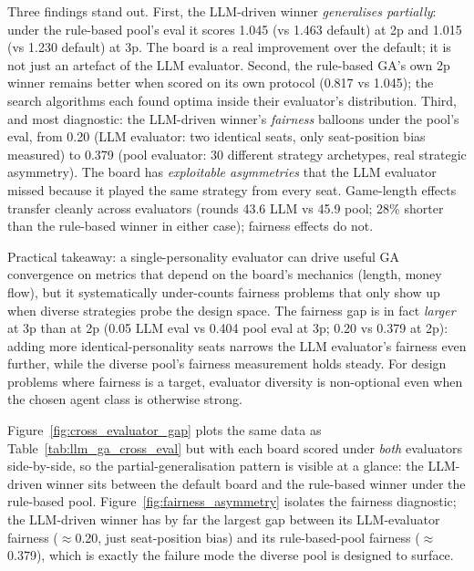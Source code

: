 \documentclass[10pt]{article}
\begin{document}
Three findings stand out. First, the LLM-driven winner \emph{generalises
partially}: under the rule-based pool's eval it scores 1.045 (vs
1.463 default) at 2p and 1.015 (vs 1.230 default) at 3p. The board is
a real improvement over the default; it is not just an artefact of the
LLM evaluator. Second, the rule-based GA's own 2p winner remains
better when scored on its own protocol (0.817 vs 1.045); the
search algorithms each found optima inside their evaluator's
distribution. Third, and most diagnostic: the
LLM-driven winner's \emph{fairness} balloons under the pool's eval,
from 0.20 (LLM evaluator: two identical seats, only seat-position
bias measured) to 0.379 (pool evaluator: 30 different strategy
archetypes, real strategic asymmetry). The board has \emph{exploitable
asymmetries} that the LLM evaluator missed because it played the same
strategy from every seat. Game-length effects transfer cleanly across
evaluators (rounds 43.6 LLM vs 45.9 pool; 28\% shorter than the
rule-based winner in either case); fairness effects do not.

Practical takeaway: a single-personality evaluator can drive useful
GA convergence on metrics that depend on the board's mechanics
(length, money flow), but it systematically under-counts fairness
problems that only show up when diverse strategies probe the design
space. The fairness gap is in fact \emph{larger} at 3p than at 2p
(0.05 LLM eval vs 0.404 pool eval at 3p; 0.20 vs 0.379 at 2p):
adding more identical-personality seats narrows the LLM evaluator's
fairness even further, while the diverse pool's fairness measurement
holds steady. For design problems where fairness is a target,
evaluator diversity is non-optional even when the chosen agent class
is otherwise strong.

Figure~\ref{fig:cross_evaluator_gap} plots the same data as
Table~\ref{tab:llm_ga_cross_eval} but with each board scored under
\emph{both} evaluators side-by-side, so the partial-generalisation
pattern is visible at a glance: the LLM-driven winner sits between
the default board and the rule-based winner under the rule-based
pool. Figure~\ref{fig:fairness_asymmetry} isolates the fairness
diagnostic; the LLM-driven winner has by far the largest gap
between its LLM-evaluator fairness ($\approx$0.20, just seat-position
bias) and its rule-based-pool fairness ($\approx$0.379), which is
exactly the failure mode the diverse pool is designed to surface.
\end{document}
